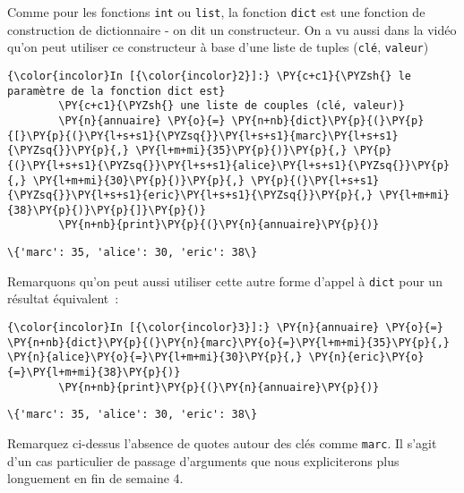     Comme pour les fonctions \texttt{int} ou \texttt{list}, la fonction
\texttt{dict} est une fonction de construction de dictionnaire - on dit
un constructeur. On a vu aussi dans la vidéo qu'on peut utiliser ce
constructeur à base d'une liste de tuples (\texttt{clé},
\texttt{valeur})

    \begin{Verbatim}[commandchars=\\\{\}]
{\color{incolor}In [{\color{incolor}2}]:} \PY{c+c1}{\PYZsh{} le paramètre de la fonction dict est}
        \PY{c+c1}{\PYZsh{} une liste de couples (clé, valeur)}
        \PY{n}{annuaire} \PY{o}{=} \PY{n+nb}{dict}\PY{p}{(}\PY{p}{[}\PY{p}{(}\PY{l+s+s1}{\PYZsq{}}\PY{l+s+s1}{marc}\PY{l+s+s1}{\PYZsq{}}\PY{p}{,} \PY{l+m+mi}{35}\PY{p}{)}\PY{p}{,} \PY{p}{(}\PY{l+s+s1}{\PYZsq{}}\PY{l+s+s1}{alice}\PY{l+s+s1}{\PYZsq{}}\PY{p}{,} \PY{l+m+mi}{30}\PY{p}{)}\PY{p}{,} \PY{p}{(}\PY{l+s+s1}{\PYZsq{}}\PY{l+s+s1}{eric}\PY{l+s+s1}{\PYZsq{}}\PY{p}{,} \PY{l+m+mi}{38}\PY{p}{)}\PY{p}{]}\PY{p}{)}
        \PY{n+nb}{print}\PY{p}{(}\PY{n}{annuaire}\PY{p}{)}
\end{Verbatim}


    \begin{Verbatim}[commandchars=\\\{\}]
\{'marc': 35, 'alice': 30, 'eric': 38\}

    \end{Verbatim}

    Remarquons qu'on peut aussi utiliser cette autre forme d'appel à
\texttt{dict} pour un résultat équivalent~:

    \begin{Verbatim}[commandchars=\\\{\}]
{\color{incolor}In [{\color{incolor}3}]:} \PY{n}{annuaire} \PY{o}{=} \PY{n+nb}{dict}\PY{p}{(}\PY{n}{marc}\PY{o}{=}\PY{l+m+mi}{35}\PY{p}{,} \PY{n}{alice}\PY{o}{=}\PY{l+m+mi}{30}\PY{p}{,} \PY{n}{eric}\PY{o}{=}\PY{l+m+mi}{38}\PY{p}{)}
        \PY{n+nb}{print}\PY{p}{(}\PY{n}{annuaire}\PY{p}{)}
\end{Verbatim}


    \begin{Verbatim}[commandchars=\\\{\}]
\{'marc': 35, 'alice': 30, 'eric': 38\}

    \end{Verbatim}

    Remarquez ci-dessus l'absence de quotes autour des clés comme
\texttt{marc}. Il s'agit d'un cas particulier de passage d'arguments que
nous expliciterons plus longuement en fin de semaine 4.

